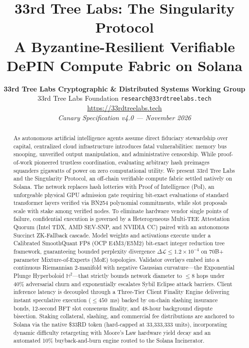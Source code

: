 \documentclass[10pt,twocolumn,letterpaper]{article}
\title{\textbf{33rd Tree Labs: The Singularity Protocol}\\
\large A Byzantine-Resilient Verifiable DePIN Compute Fabric on Solana}
\author{\textbf{33rd Tree Labs Cryptographic \& Distributed Systems Working Group}\\
\small 33rd Tree Labs Foundation \quad \texttt{research@33rdtreelabs.tech} \quad \url{https://33rdtreelabs.tech}\\
\small \textit{Canary Specification v4.0 --- November 2026}}
\date{}
\begin{document}
\maketitle

\begin{abstract}
As autonomous artificial intelligence agents assume direct fiduciary stewardship over capital, centralized cloud infrastructure introduces fatal vulnerabilities: memory bus snooping, unverified output manipulation, and administrative censorship. While proof-of-work pioneered trustless coordination, evaluating arbitrary hash preimages squanders gigawatts of power on zero computational utility. We present 33rd Tree Labs and the Singularity Protocol, an off-chain verifiable compute fabric settled natively on Solana. The network replaces hash lotteries with Proof of Intelligence (PoI), an unforgeable physical GPU admission gate requiring bit-exact evaluations of standard transformer layers verified via BN254 polynomial commitments, while slot proposals scale with stake among verified nodes. To eliminate hardware vendor single points of failure, confidential execution is governed by a Heterogeneous Multi-TEE Attestation Quorum (Intel TDX, AMD SEV-SNP, and NVIDIA CC) paired with an autonomous Succinct ZK-Fallback cascade. Model weights and activations execute under a Calibrated SmoothQuant FP8 (OCP E4M3/E5M2) bit-exact integer reduction tree framework, guaranteeing bounded perplexity divergence $\Delta \mathcal{L} \le 1.2 \times 10^{-4}$ on 70B+ parameter Mixture-of-Experts (MoE) topologies. Validator overlays embed into a continuous Riemannian 2-manifold with negative Gaussian curvature---the Exponential Plunge Hyperboloid $\mathbb{H}^2$---that strictly bounds network diameter to $\le 8$ hops under 40\% adversarial churn and exponentially escalates Sybil Eclipse attack barriers. Client inference latency is decoupled through a Three-Tier Client Finality Engine delivering instant speculative execution ($\le 450$~ms) backed by on-chain slashing insurance bonds, 12-second BFT slot consensus finality, and 48-hour background dispute bisection. Staking collateral, slashing, and commercial fee distributions are anchored to Solana via the native \$33RD token (hard-capped at 33,333,333 units), incorporating dynamic difficulty retargeting with Moore's Law hardware yield decay and an automated 10\% buyback-and-burn engine routed to the Solana Incinerator.
\end{abstract}
\end{document}
